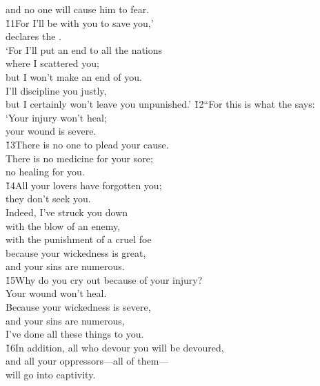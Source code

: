 \begin{poetry}
\poemll    and no one will cause him to fear. \\
\poeml \v{11}For I'll be with you to save you,' \\
\poemll    declares the . \\
\poeml `For I'll put an end to all the nations \\
\poemll    where I scattered you; \\
\poemlll       but I won't make an end of you. \\
\poeml I'll discipline you justly, \\
\poemll    but I certainly won't leave you unpunished.'
\poeml \v{12}``For this is what the  says: \\
\poeml `Your injury won't heal; \\
\poemll    your wound is severe. \\
\poeml \v{13}There is no one to plead your cause. \\
\poemll    There is no medicine for your sore; \\
\poemlll       no healing for you. \\
\poeml \v{14}All your lovers have forgotten you; \\
\poemll    they don't seek you. \\
\poeml Indeed, I've struck you down \\
\poemll    with the blow of an enemy, \\
\poemlll       with the punishment of a cruel foe \\
\poeml because your wickedness is great, \\
\poemll    and your sins are numerous. \\
\poeml \v{15}Why do you cry out because of your injury? \\
\poemll    Your wound won't heal. \\
\poeml Because your wickedness is severe, \\
\poemll    and your sins are numerous, \\
\poemlll       I've done all these things to you. \\
\poeml \v{16}In addition, all who devour you will be devoured, \\
\poemll    and all your oppressors---all of them--- \\
\poemlll       will go into captivity. \\

\end{poetry}
